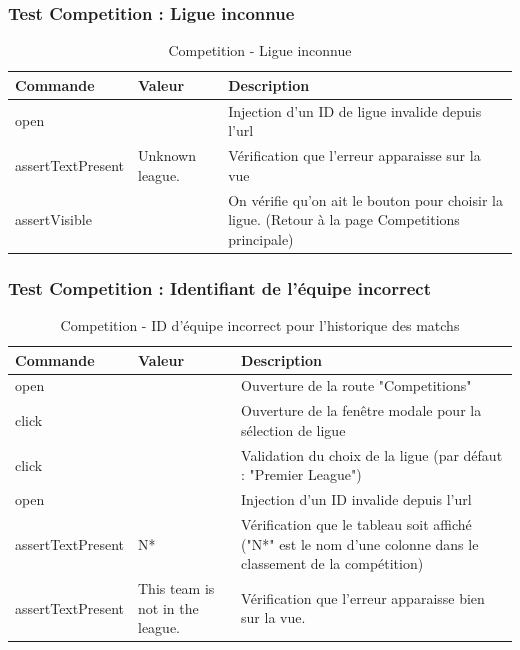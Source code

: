 \documentclass[a4paper,14pt]{extarticle}
\begin{document}
{\newpage

\subsubsection{Test Competition : Ligue inconnue}

\begin{table}[htp]
    \centering
    \begin{tabular}{|m{4cm}|m{4cm}|m{6cm}|}
    \hline
    \textbf{Commande} & \textbf{Valeur}                                      & \textbf{Description}                                                                    \\ \hline
    open              &                 & Injection d'un ID de ligue invalide depuis l'url \\ \hline
    assertTextPresent & Unknown league. & Vérification que l'erreur apparaisse sur la vue                                                                                                   \\ \hline
    assertVisible     &                 & On vérifie qu'on ait le bouton pour choisir la ligue. (Retour à la page Competitions principale)     \\ \hline
    \end{tabular}
    \label{tab:CompLigueInconnue}
    \caption{Competition - Ligue inconnue}
\end{table}

\subsubsection{Test Competition : Identifiant de l'équipe incorrect}

\begin{table}[htp]
    \centering
    \begin{tabular}{|m{4cm}|m{4cm}|m{6cm}|}
    \hline
    \textbf{Commande} & \textbf{Valeur} & \textbf{Description} \\ \hline
    open              &                 & Ouverture de la route "Competitions" \\ \hline
    click             &                 & Ouverture de la fenêtre modale pour la sélection de ligue \\ \hline
    click             &                 & Validation du choix de la ligue (par défaut : "Premier League") \\ \hline
    open              &                 & Injection d'un ID invalide depuis l'url   \\ \hline
    assertTextPresent & N*              & Vérification que le tableau soit affiché ("N*" est le nom d'une colonne dans le classement de la compétition)     \\ \hline
    assertTextPresent & This team is not in the league. & Vérification que l'erreur apparaisse bien sur la vue.     \\ \hline
    \end{tabular}
    \label{tab:CompIdIncorrect}
    \caption{Competition - ID d'équipe incorrect pour l'historique des matchs}
\end{table}

}
\end{document}
